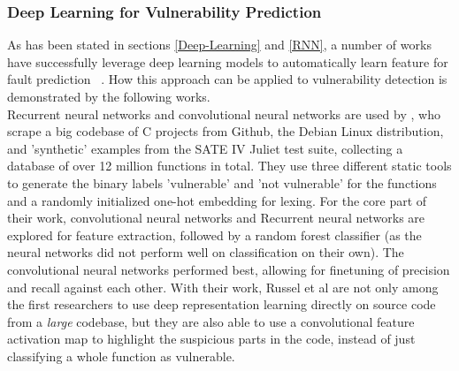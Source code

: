 \documentclass[
	a4paper,
	pagesize,
	pdftex,
	12pt,
	twoside, %
	BCOR=5mm, %
	ngerman,
	fleqn,
	final,
	]{scrartcl}
\begin{document}
\subsubsection{Deep Learning for Vulnerability Prediction}
As has been stated in sections \ref{Deep-Learning} and \ref{RNN}, a number of works have successfully leverage deep learning models to automatically learn feature for fault prediction ~\cite{IEEE.2015b,IEEE.2016,Wang.2016}. How this approach can be applied to vulnerability detection is demonstrated by the following works.\\
Recurrent neural networks and convolutional neural networks are used by \cite{Russell.2018}, who scrape a big codebase of C projects from Github, the Debian Linux distribution, and 'synthetic' examples from the SATE IV Juliet test suite, collecting a database of over 12 million functions in total. They use three different static tools to generate the binary labels 'vulnerable' and 'not vulnerable' for the functions and a randomly initialized one-hot embedding for lexing. For the core part of their work, convolutional neural networks and Recurrent neural networks are explored for feature extraction, followed by a random forest classifier (as the neural networks did not perform well on classification on their own). The convolutional neural networks performed best, allowing for finetuning of precision and recall against each other. With their work, Russel et al are not only among the first researchers to use deep representation learning directly on source code from a \textit{large} codebase, but they are also able to use a convolutional feature activation map to highlight the suspicious parts in the code, instead of just classifying a whole function as vulnerable.\\
\end{document}
